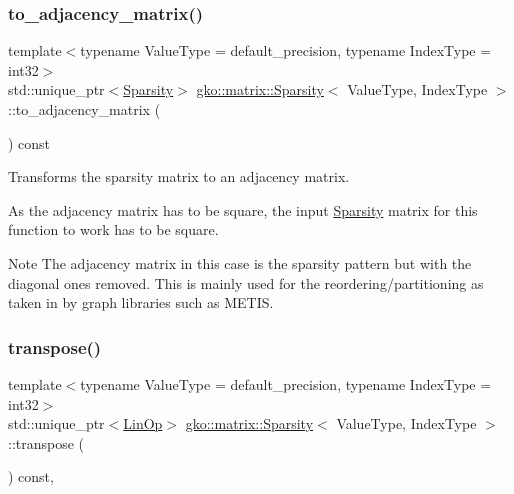 \subsubsection{\texorpdfstring{to\+\_\+adjacency\+\_\+matrix()}{to\_adjacency\_matrix()}}
{\footnotesize\ttfamily template$<$typename Value\+Type  = default\+\_\+precision, typename Index\+Type  = int32$>$ \\
std\+::unique\+\_\+ptr$<$\hyperlink{classgko_1_1matrix_1_1Sparsity}{Sparsity}$>$ \hyperlink{classgko_1_1matrix_1_1Sparsity}{gko\+::matrix\+::\+Sparsity}$<$ Value\+Type, Index\+Type $>$\+::to\+\_\+adjacency\+\_\+matrix (\begin{DoxyParamCaption}{ }\end{DoxyParamCaption}) const}



Transforms the sparsity matrix to an adjacency matrix. 

As the adjacency matrix has to be square, the input \hyperlink{classgko_1_1matrix_1_1Sparsity}{Sparsity} matrix for this function to work has to be square.

\begin{DoxyNote}{Note}
The adjacency matrix in this case is the sparsity pattern but with the diagonal ones removed. This is mainly used for the reordering/partitioning as taken in by graph libraries such as M\+E\+T\+IS. 
\end{DoxyNote}
\mbox{\label{classgko_1_1matrix_1_1Sparsity_a524ae904a3a1335fe2d4da8d43541872}} 
\subsubsection{\texorpdfstring{transpose()}{transpose()}}
{\footnotesize\ttfamily template$<$typename Value\+Type  = default\+\_\+precision, typename Index\+Type  = int32$>$ \\
std\+::unique\+\_\+ptr$<$\hyperlink{classgko_1_1LinOp}{Lin\+Op}$>$ \hyperlink{classgko_1_1matrix_1_1Sparsity}{gko\+::matrix\+::\+Sparsity}$<$ Value\+Type, Index\+Type $>$\+::transpose (\begin{DoxyParamCaption}{ }\end{DoxyParamCaption}) const\hspace{0.3cm}{\ttfamily [override]}, {\ttfamily [virtual]}}



